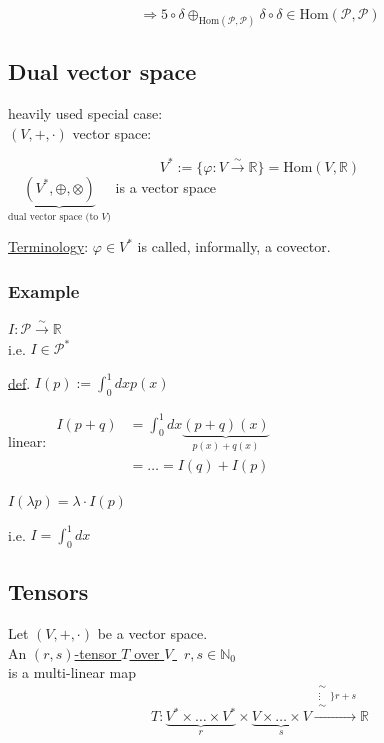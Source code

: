 \[
\Longrightarrow 5 \circ \delta \oplus_{\text{Hom}(\mathcal{P},\mathcal{P})} \delta \circ \delta \in \text{Hom}(\mathcal{P},\mathcal{P})
\]

\subsection{Dual vector space}

heavily used special case: \\
$(V,+,\cdot)$ vector space:  
\begin{definition}
	\[
	V^* := \lbrace \varphi : V \xrightarrow{ \sim } \mathbb{R} \rbrace = \text{Hom}(V,\mathbb{R})
	\]
	$\underbrace{ (V^*, \oplus, \otimes) }_{\text{dual vector space (to $V$)}}$ is a vector space
\end{definition}

\underline{Terminology}: $\varphi \in V^*$ is called, informally, a covector.  

\subsubsection*{Example} $I : \mathcal{P} \xrightarrow{ \sim} \mathbb{R}$ \\
i.e. $I \in \mathcal{P}^*$

\underline{def}. $I(p) := \int_0^1 dx p(x)$

linear: $\begin{aligned}  I(p+q) & = \int_0^1 dx \underbrace{ ( p+q)(x) }_{p(x) + q(x)} \\
& = \dots = I(q) + I(p) \end{aligned}$

$I(\lambda p) = \lambda \cdot I(p)$

i.e. $I = \int_0^1 dx$

\subsection{Tensors}

\begin{definition}
	Let $(V,+,\cdot)$ be a vector space. \\
	An \underline{ $(r,s)$-tensor $T$ over $V$ } \qquad \, $r,s \in \mathbb{N}_0 $\\
	is a multi-linear map
	\[
	T: \underbrace{ V^* \times \dots \times V^* }_r \times \underbrace{ V \times \dots \times V}_s \xrightarrow{ \substack{ \sim \\ \vdots \\ \sim } \rbrace r + s } \mathbb{R}
	\]
\end{definition}

